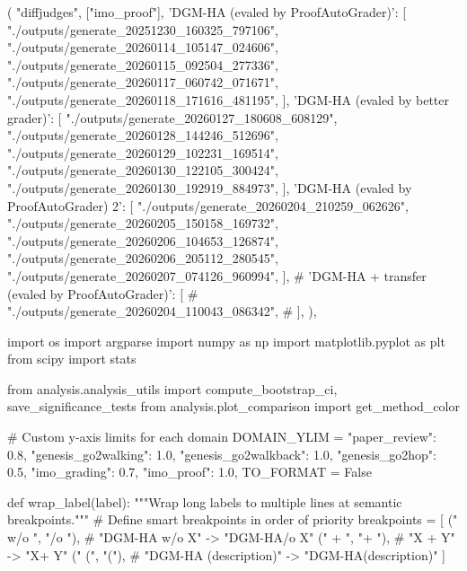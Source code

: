 
(
            "diffjudges",
            ["imo_proof"],
            {
                'DGM-HA (evaled by ProofAutoGrader)': [
                    "./outputs/generate_20251230_160325_797106",
                    "./outputs/generate_20260114_105147_024606",
                    "./outputs/generate_20260115_092504_277336",
                    "./outputs/generate_20260117_060742_071671",
                    "./outputs/generate_20260118_171616_481195",
                ],
                'DGM-HA (evaled by better grader)': [
                    "./outputs/generate_20260127_180608_608129",
                    "./outputs/generate_20260128_144246_512696",
                    "./outputs/generate_20260129_102231_169514",
                    "./outputs/generate_20260130_122105_300424",
                    "./outputs/generate_20260130_192919_884973",
                ],
                'DGM-HA (evaled by ProofAutoGrader) 2': [
                    "./outputs/generate_20260204_210259_062626",
                    "./outputs/generate_20260205_150158_169732",
                    "./outputs/generate_20260206_104653_126874",
                    "./outputs/generate_20260206_205112_280545",
                    "./outputs/generate_20260207_074126_960994",
                ],
                # 'DGM-HA + transfer (evaled by ProofAutoGrader)': [
                #     "./outputs/generate_20260204_110043_086342",
                # ],
            }
        ),







import os
import argparse
import numpy as np
import matplotlib.pyplot as plt
from scipy import stats

from analysis.analysis_utils import compute_bootstrap_ci, save_significance_tests
from analysis.plot_comparison import get_method_color

# Custom y-axis limits for each domain
DOMAIN_YLIM = {
    "paper_review": 0.8,
    "genesis_go2walking": 1.0,
    "genesis_go2walkback": 1.0,
    "genesis_go2hop": 0.5,
    "imo_grading": 0.7,
    "imo_proof": 1.0,
}
TO_FORMAT = False


def wrap_label(label):
    """Wrap long labels to multiple lines at semantic breakpoints."""
    # Define smart breakpoints in order of priority
    breakpoints = [
        (" w/o ", "\nw/o "),           # "DGM-HA w/o X" -> "DGM-HA\nw/o X"
        (" + ", "\n+ "),               # "X + Y" -> "X\n+ Y"
        (" (", "\n("),                 # "DGM-HA (description)" -> "DGM-HA\n(description)"
    ]

